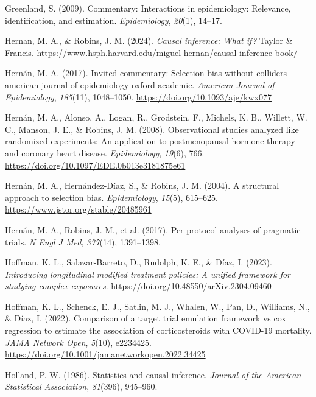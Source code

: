 \documentclass[
  single column]{article}
\newlength{\cslhangindent}
\newenvironment{CSLReferences}[2] %
 {\begin{list}{}{%
  \setlength{\itemindent}{0pt}
  \setlength{\leftmargin}{0pt}
  \setlength{\parsep}{0pt}
  \ifodd #1
   \setlength{\leftmargin}{\cslhangindent}
   \setlength{\itemindent}{-1\cslhangindent}
  \fi
  \setlength{\itemsep}{#2\baselineskip}}}
 {\end{list}}
\begin{document}
\begin{CSLReferences}{1}{0}
Greenland, S. (2009). Commentary: Interactions in epidemiology:
Relevance, identification, and estimation. \emph{Epidemiology},
\emph{20}(1), 14--17.

Hernan, M. A., \& Robins, J. M. (2024). \emph{Causal inference: What
if?} Taylor \& Francis.
\url{https://www.hsph.harvard.edu/miguel-hernan/causal-inference-book/}

Hernán, M. A. (2017). Invited commentary: Selection bias without
colliders \textbar{} american journal of epidemiology \textbar{} oxford
academic. \emph{American Journal of Epidemiology}, \emph{185}(11),
1048--1050. \url{https://doi.org/10.1093/aje/kwx077}

Hernán, M. A., Alonso, A., Logan, R., Grodstein, F., Michels, K. B.,
Willett, W. C., Manson, J. E., \& Robins, J. M. (2008). Observational
studies analyzed like randomized experiments: An application to
postmenopausal hormone therapy and coronary heart disease.
\emph{Epidemiology}, \emph{19}(6), 766.
\url{https://doi.org/10.1097/EDE.0b013e3181875e61}

Hernán, M. A., Hernández-Díaz, S., \& Robins, J. M. (2004). A structural
approach to selection bias. \emph{Epidemiology}, \emph{15}(5), 615--625.
\url{https://www.jstor.org/stable/20485961}

Hernán, M. A., Robins, J. M., et al. (2017). Per-protocol analyses of
pragmatic trials. \emph{N Engl J Med}, \emph{377}(14), 1391--1398.

Hoffman, K. L., Salazar-Barreto, D., Rudolph, K. E., \& Díaz, I. (2023).
\emph{Introducing longitudinal modified treatment policies: A unified
framework for studying complex exposures}.
\url{https://doi.org/10.48550/arXiv.2304.09460}

Hoffman, K. L., Schenck, E. J., Satlin, M. J., Whalen, W., Pan, D.,
Williams, N., \& Díaz, I. (2022). Comparison of a target trial emulation
framework vs cox regression to estimate the association of
corticosteroids with COVID-19 mortality. \emph{JAMA Network Open},
\emph{5}(10), e2234425.
\url{https://doi.org/10.1001/jamanetworkopen.2022.34425}

Holland, P. W. (1986). Statistics and causal inference. \emph{Journal of
the American Statistical Association}, \emph{81}(396), 945--960.


\end{CSLReferences}
\end{document}
